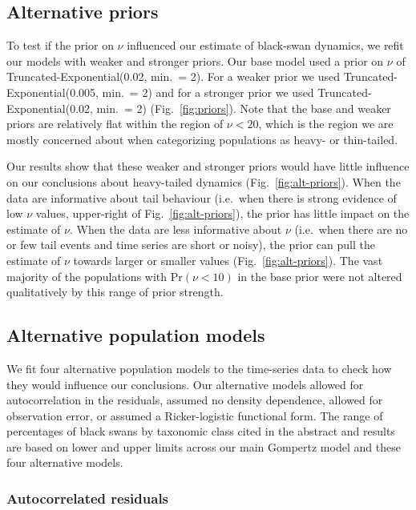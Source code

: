\subsection{Alternative priors}

To test if the prior on $\nu$ influenced our estimate of black-swan dynamics,
we refit our models with weaker and stronger priors. Our base model used a
prior on $\nu$ of Truncated-Exponential(0.02, min.\ = 2). For a weaker prior
we used Truncated-Exponential(0.005, min.\ = 2) and for a stronger prior we
used Truncated-Exponential(0.02, min.\ = 2) (Fig.~\ref{fig:priors}). Note that
the base and weaker priors are relatively flat within the region of $\nu <
20$, which is the region we are mostly concerned about when categorizing populations
as heavy- or thin-tailed.

Our results show that these weaker and stronger priors would have little
influence on our conclusions about heavy-tailed dynamics
(Fig.~\ref{fig:alt-priors}). When the data are informative about tail
behaviour (i.e.\ when there is strong evidence of low $\nu$ values,
upper-right of Fig.~\ref{fig:alt-priors}), the prior has little impact on the
estimate of $\nu$. When the data are less informative about $\nu$ (i.e.\ when
there are no or few tail events and time series are short or noisy), the prior
can pull the estimate of $\nu$ towards larger or smaller values
(Fig.~\ref{fig:alt-priors}). The vast majority of the populations with Pr$(\nu
< 10)$ in the base prior were not altered qualitatively by this range of prior
strength.

\subsection{Alternative population models}

We fit four alternative population models to the time-series data to check how
they would influence our conclusions. Our alternative models allowed for
autocorrelation in the residuals, assumed no density dependence, allowed for
observation error, or assumed a Ricker-logistic functional form. The range of
percentages of black swans by taxonomic class cited in the abstract and
results are based on lower and upper limits across our main Gompertz model and
these four alternative models.

\subsubsection{Autocorrelated residuals}

